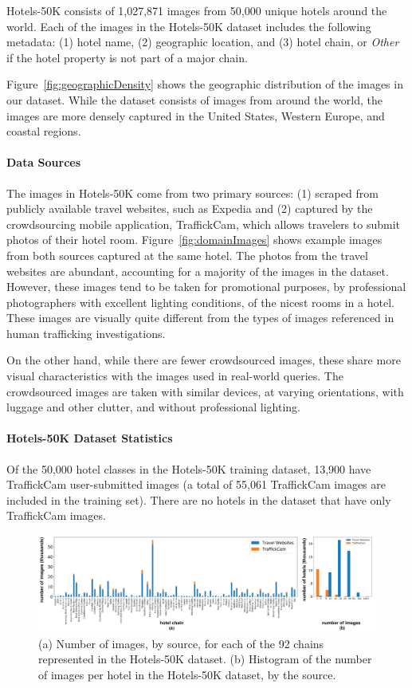 Hotels-50K consists of 1,027,871 images from 50,000 unique hotels around the world. 
Each of the images in the Hotels-50K dataset includes the following metadata: (1) hotel name, (2) geographic location, and (3) hotel chain, or \emph{Other} if the hotel property is not part of a major chain.

Figure~\ref{fig:geographicDensity} shows the geographic distribution of the images in our dataset. While the dataset consists of images from around the world, the images are more densely captured in the United States, Western Europe, and coastal regions.

\paragraph{Data Sources} The images in Hotels-50K come from two primary sources: (1) scraped from publicly available travel websites, such as Expedia and (2) captured by the crowdsourcing mobile application, TraffickCam, which allows travelers to submit photos of their hotel room. Figure~\ref{fig:domainImages} shows example images from both sources captured at the same hotel. The photos from the travel websites are abundant, accounting for a majority of the images in the dataset. However, these images tend to be taken for 
promotional purposes, by professional photographers with excellent lighting 
conditions, of the nicest rooms in a hotel. These images are visually quite different from the types of images referenced in human trafficking investigations.

On the other hand, while there are fewer crowdsourced images, these share more visual characteristics with the images used in real-world queries. The crowdsourced images are taken with similar devices, at varying orientations, with luggage and other clutter, and without professional lighting.

\paragraph{Hotels-50K Dataset Statistics} Of the 50,000 hotel classes in the Hotels-50K training dataset, 13,900 have TraffickCam user-submitted images (a total of 55,061 TraffickCam images are included in the training set). There are no hotels in the dataset that have only TraffickCam images.

\begin{figure}
    \centering    \includegraphics[width=2\columnwidth]{figures/chapter3/imagesChainsAndHotels.jpg}
    \caption{(a) Number of images, by source, for each of the 92 chains represented in the Hotels-50K dataset. (b) Histogram of the number of images per hotel in the Hotels-50K dataset, by the source.}
    \label{fig:imsPerClass}
\end{figure}

